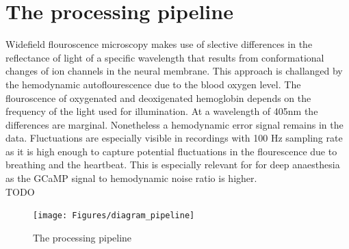 \section{The processing pipeline}
Widefield flouroscence microscopy makes use of slective differences in the reflectance of light of a specific wavelength that results from conformational changes of ion channels in the neural membrane. This approach is challanged by the hemodynamic autoflourescence due to the blood oxygen level. The flouroscence of oxygenated and deoxigenated hemoglobin depends on the frequency of the light used for illumination. At a wavelength of 405nm the differences are marginal. Nonetheless a hemodynamic error signal remains in the data. Fluctuations are especially visible in recordings with 100 Hz sampling rate as it is high enough to capture potential fluctuations in the flourescence due to breathing and the heartbeat. This is especially relevant for for deep anaesthesia as the GCaMP signal to hemodynamic noise ratio is higher.\\
TODO\\

\begin{figure}[!htb]
\centering
\texttt{[image: Figures/diagram\_pipeline]}
\decoRule
\caption[The processing pipeline]{The processing pipeline}
\label{fig:diagram_pipeline}
\end{figure}
